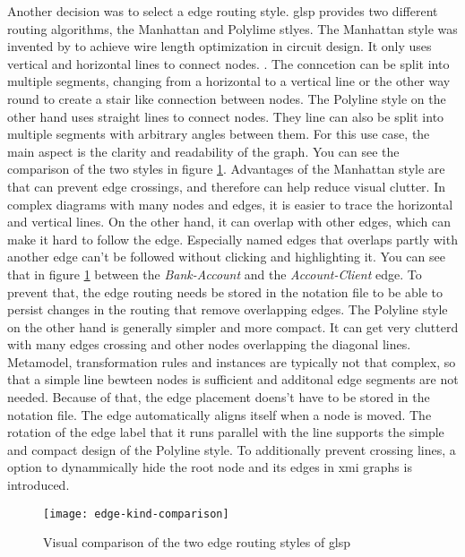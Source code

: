   


  Another decision was to select a edge routing style. \ac{glsp} provides two different routing algorithms, the Manhattan and Polylime stlyes. The Manhattan style was invented by \citeauthor{manhattan} to achieve wire length optimization in circuit design.  It only uses vertical and horizontal lines to connect nodes. \cite{manhattan}. The conncetion can be split into multiple segments, changing from a horizontal to a vertical line or the other way round to create a stair like connection between nodes. The Polyline style on the other hand uses straight lines to connect nodes. They line can also be split into multiple segments with arbitrary angles between them.
  For this use case, the main aspect is the clarity and readability of the graph. You can see the comparison of the two styles in figure \ref{fig:edge-kind-comparison}. Advantages of the Manhattan style are that can prevent edge crossings, and therefore can help reduce visual clutter. In complex diagrams with many nodes and edges, it is easier to trace the horizontal and vertical lines. On the other hand, it can overlap with other edges, which can make it hard to follow the edge. Especially named edges that overlaps partly with another edge can't be followed without clicking and highlighting it. You can see that in figure \ref{fig:edge-kind-comparison} between the \textit{Bank-Account} and the \textit{Account-Client} edge. To prevent that, the edge routing needs be stored in the notation file to be able to persist changes in the routing that remove overlapping edges. The Polyline style on the other hand is generally simpler and more compact. It can get very clutterd with many edges crossing and other nodes overlapping the diagonal lines. Metamodel, transformation rules and instances are typically not that complex, so that a simple line bewteen nodes is sufficient and additonal edge segments are not needed. Because of that, the edge placement doens't have to be stored in the notation file. The edge automatically aligns itself when a node is moved. The rotation of the edge label that it runs parallel with the line supports the simple and compact design of the Polyline style. To additionally prevent crossing lines, a option to dynammically hide the root node and its edges in \ac{xmi} graphs is introduced.

  \begin{figure}
    \centering
    \texttt{[image: edge-kind-comparison]}
    \caption{Visual comparison of the two edge routing styles of \ac{glsp}}
    \label{fig:edge-kind-comparison}
  \end{figure}

